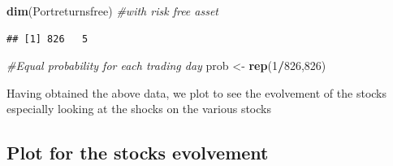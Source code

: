 \documentclass[]{article}
\newenvironment{Shaded}{\begin{snugshade}}{\end{snugshade}}
\newcommand{\KeywordTok}[1]{\textcolor[rgb]{0.13,0.29,0.53}{\textbf{#1}}}
\newcommand{\DecValTok}[1]{\textcolor[rgb]{0.00,0.00,0.81}{#1}}
\newcommand{\StringTok}[1]{\textcolor[rgb]{0.31,0.60,0.02}{#1}}
\newcommand{\CommentTok}[1]{\textcolor[rgb]{0.56,0.35,0.01}{\textit{#1}}}
\newcommand{\OperatorTok}[1]{\textcolor[rgb]{0.81,0.36,0.00}{\textbf{#1}}}
\newcommand{\NormalTok}[1]{#1}
\begin{document}
\begin{Shaded}
\begin{Highlighting}[]
\KeywordTok{dim}\NormalTok{(Portreturnsfree) }\CommentTok{#with risk free asset}
\end{Highlighting}
\end{Shaded}

\begin{verbatim}
## [1] 826   5
\end{verbatim}

\begin{Shaded}
\begin{Highlighting}[]
\CommentTok{#Equal probability for each trading day}
\NormalTok{prob <-}\StringTok{ }\KeywordTok{rep}\NormalTok{(}\DecValTok{1}\OperatorTok{/}\DecValTok{826}\NormalTok{,}\DecValTok{826}\NormalTok{) }
\end{Highlighting}
\end{Shaded}

Having obtained the above data, we plot to see the evolvement of the
stocks especially looking at the shocks on the various stocks

\subsection{Plot for the stocks
evolvement}\label{plot-for-the-stocks-evolvement}
\end{document}
